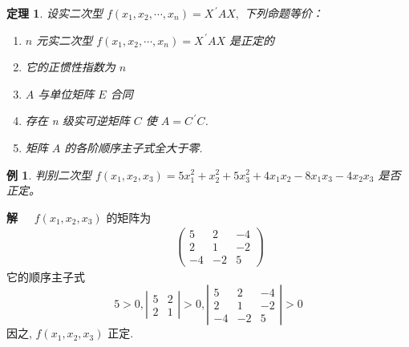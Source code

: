 \documentclass[13pt]{beamer}
\newtheorem{exa}{例}
\newtheorem*{theo}{定理}
\def\sol{{\bf 解~~ }}
\begin{document}
\begin{frame}
\begin{theo}
	设实二次型 $f\left(x_{1}, x_{2}, \cdots, x_{n}\right)=X^{\,\prime} A X,$ 下列命题等价：
	\begin{enumerate}
		\item $n$ 元实二次型 $f\left(x_{1}, x_{2}, \cdots, x_{n}\right)=X^{\, \prime} A X$ 是正定的
		\item 它的正惯性指数为 $n$
		\item $A$ 与单位矩阵 $E$ 合同
		\item 存在 n 级实可逆矩阵 $C$
		使 $A=C^{\,\prime} C$.
		\item 矩阵 $A$ 的各阶顺序主子式全大于零. 
	\end{enumerate}
\end{theo}
\end{frame}

\begin{frame}
\begin{exa}
判别二次型 $f\left(x_{1}, x_{2}, x_{3}\right)=5 x_{1}^{2}+x_{2}^{2}+5 x_{3}^{2}+4 x_{1} x_{2}-8 x_{1} x_{3}-4 x_{2} x_{3}$
是否正定。
\end{exa}
\sol 
$f\left(x_{1}, x_{2}, x_{3}\right)$ { 的矩阵为 } 
\[
\begin{array}{l}

\qquad\left(\begin{array}{rrr}
5 & 2 & -4 \\
2 & 1 & -2 \\
-4 & -2 & 5
\end{array}\right)
\end{array}
\]
它的顺序主子式
\[
5>0,\left|\begin{array}{cc}
5 & 2 \\
2 & 1
\end{array}\right|>0,\left|\begin{array}{rrr}
5 & 2 & -4 \\
2 & 1 & -2 \\
-4 & -2 & 5
\end{array}\right|>0
\]
因之, $f\left(x_{1}, x_{2}, x_{3}\right)$ 正定.
\end{frame}
\end{document}
